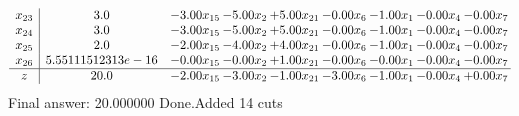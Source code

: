 \documentclass[8pt]{article}
\begin{document}
\[\begin{array}{c| c c@{\hskip 2pt} c@{\hskip 2pt} c@{\hskip 2pt} c@{\hskip 2pt} c@{\hskip 2pt} c@{\hskip 2pt} c@{\hskip 2pt} }
 x_{23}   &  3.0 & -3.00 x_{15} & -5.00 x_{2} & +  5.00 x_{21} & -0.00 x_{6} & -1.00 x_{1} & -0.00 x_{4} & -0.00 x_{7}\\
 x_{24}   &  3.0 & -3.00 x_{15} & -5.00 x_{2} & +  5.00 x_{21} & -0.00 x_{6} & -1.00 x_{1} & -0.00 x_{4} & -0.00 x_{7}\\
 x_{25}   &  2.0 & -2.00 x_{15} & -4.00 x_{2} & +  4.00 x_{21} & -0.00 x_{6} & -1.00 x_{1} & -0.00 x_{4} & -0.00 x_{7}\\
 x_{26}   &  5.55111512313e-16 & -0.00 x_{15} & -0.00 x_{2} & +  1.00 x_{21} & -0.00 x_{6} & -0.00 x_{1} & -0.00 x_{4} & -0.00 x_{7}\\
\hline
z    &  20.0 & -2.00 x_{15} & -3.00 x_{2} & -1.00 x_{21} & -3.00 x_{6} & -1.00 x_{1} & -0.00 x_{4} & +  0.00 x_{7}\\
\end{array}\]
 Final answer: 20.000000 
Done.Added 14 cuts 
\end{document}
